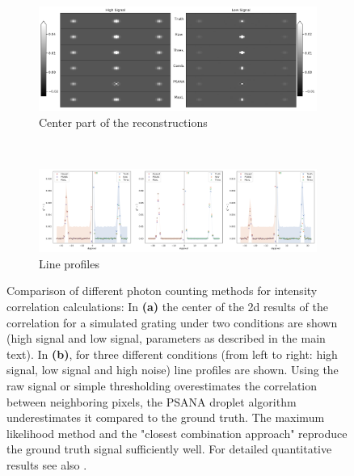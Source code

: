 \begin{figure}
	\centering
	\begin{subfigure}[b]{0.85\textwidth}
		\includegraphics[width=\linewidth]{images/photonreconimg.pdf}	
		\caption{Center part of the reconstructions}
		\label{fig:photonreconimg}
	\end{subfigure}
\\
	\begin{subfigure}[b]{0.95\textwidth}
		\includegraphics[width=\linewidth]{images/photonrecon.pdf}
		\caption{Line profiles}
		\label{fig:photonrecon}
	\end{subfigure}	
	
	\caption[Comparison of different photon counting methods for intensity correlation calculations]{Comparison of different photon counting methods for intensity correlation calculations: In \textbf{(a)} the center of the 2d results of the correlation for a simulated grating under two conditions are shown (high signal and low signal, parameters as described in the main text). In  \textbf{(b)}, for three different conditions (from left to right: high signal, low signal and high noise) line profiles are shown. Using the raw signal or simple thresholding overestimates the correlation between neighboring pixels, the PSANA droplet algorithm underestimates it compared to the ground truth. The maximum likelihood method and the "closest combination approach" reproduce the ground truth signal sufficiently well. For detailed quantitative results see also .}
\end{figure}
